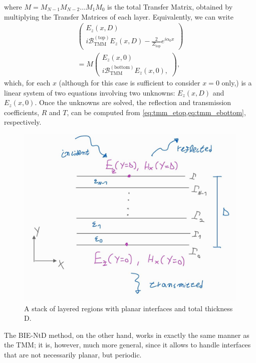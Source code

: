\documentclass[reprint,amsmath,amssymb,
 aps]{revtex4-2}
\newcommand{\Bcal}{\mathcal{B}}
\begin{document}
where $M = M_{N-1}M_{N-2}\dots M_1M_0$ is the total Transfer Matrix, obtained by multiplying the Transfer Matrices of each layer. Equivalently, we can write
\begin{align}
\begin{pmatrix}
E_z(x,D) \\
i\Bcal_\text{TMM}^{(\text{top})}E_z(x,D) - \frac{2}{Z_\text{top}}e^{i\alpha_0 x} 
\end{pmatrix} 
\nonumber\\= M
\begin{pmatrix}
E_z(x,0) \\
i\Bcal_\text{TMM}^{(\text{bottom})}E_z(x,0),
\end{pmatrix},
\end{align}
which, for each $x$ (although for this case is sufficient to consider $x=0$ only,) is a linear system of two equations involving two unknowns: $E_z(x,D)$ and $E_z(x,0)$. Once the unknowns are solved, the reflection and transmission coefficients, $R$ and $T$, can be computed from \cref{eq:tmm_etop,eq:tmm_ebottom}, respectively.

\begin{figure}[h!]
\includegraphics[width=0.6\columnwidth]{figures/t2.jpg}
\caption{A stack of layered regions with planar interfaces and total
thickness D.}
\label{fig:t2}
\end{figure}

The BIE-NtD method, on the other hand, works in exactly the same manner as the TMM; it is, however, much more general, since it allows to handle interfaces that are not necessarily planar, but periodic. 
\end{document}
